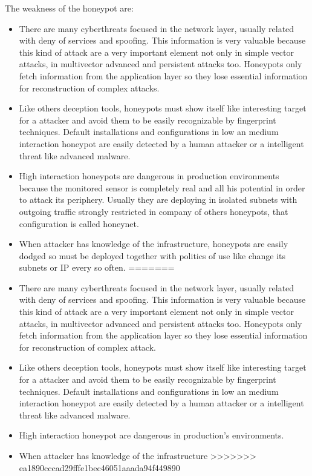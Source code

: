 \documentclass[a4paper]{llncs}
\begin{document}
The weakness of the honeypot are:
\begin{itemize}
<<<<<<< HEAD
\item There are many cyberthreats focused in the network layer, usually related with deny of services and spoofing. This information is very valuable because this kind of attack are a very important element not only in simple vector attacks, in multivector advanced and persistent attacks too. Honeypots only fetch information from the application layer so they lose essential information for reconstruction of complex attacks.
\item Like others deception tools, honeypots must show itself like interesting target for a attacker and avoid them to be easily recognizable by fingerprint techniques. Default installations and configurations in low an medium interaction honeypot are easily detected by a human attacker or a intelligent threat like advanced malware.
\item High interaction honeypots are dangerous in production environments because the monitored sensor is completely real and all his potential in order to attack its periphery. Usually they are deploying in isolated subnets with outgoing traffic strongly restricted in company of others honeypots, that configuration is called honeynet.
\item When attacker has knowledge of the infrastructure, honeypots are easily dodged so must be deployed together with politics of use like change its subnets or IP every so often.
=======
\item There are many cyberthreats focused in the network layer, usually related with deny of services and spoofing. This information is very valuable because this kind of attack are a very important element not only in simple vector attacks, in multivector advanced and persistent attacks too. Honeypots only fetch information from the application layer so they lose essential information for reconstruction of complex attack.
\item Like others deception tools, honeypots must show itself like interesting target for a attacker and avoid them to be easily recognizable by fingerprint techniques. Default installations and configurations in low an medium interaction honeypot are easily detected by a human attacker or a intelligent threat like advanced malware. %
\item High interaction honeypot are dangerous in production's environments.
\item When attacker has knowledge of the infrastructure 
>>>>>>> ea1890cccad29fffe1bec46051aaada94f449890
\end{itemize}
\end{document}
